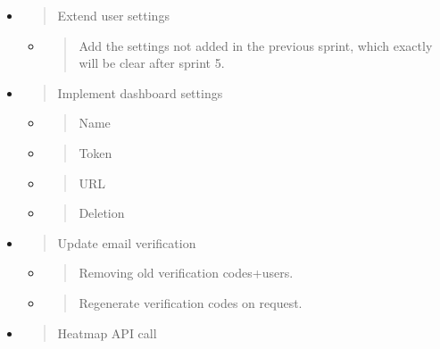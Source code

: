 \begin{itemize}
\item
  \begin{quote}
  Extend user settings
  \end{quote}

  \begin{itemize}
  \item
    \begin{quote}
    Add the settings not added in the previous sprint, which exactly
    will be clear after sprint 5.
    \end{quote}
  \end{itemize}
\item
  \begin{quote}
  Implement dashboard settings
  \end{quote}

  \begin{itemize}
  \item
    \begin{quote}
    Name
    \end{quote}
  \item
    \begin{quote}
    Token
    \end{quote}
  \item
    \begin{quote}
    URL
    \end{quote}
  \item
    \begin{quote}
    Deletion
    \end{quote}
  \end{itemize}
\item
  \begin{quote}
  Update email verification
  \end{quote}

  \begin{itemize}
  \item
    \begin{quote}
    Removing old verification codes+users.
    \end{quote}
  \item
    \begin{quote}
    Regenerate verification codes on request.
    \end{quote}
  \end{itemize}
\item
  \begin{quote}
  Heatmap API call
  \end{quote}
\end{itemize}


